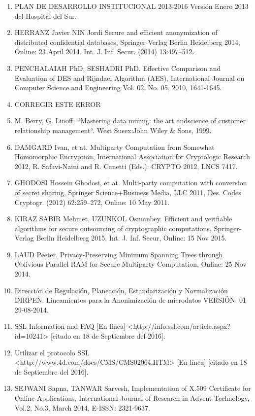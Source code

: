 \documentclass[a4paper,openright,12pt]{book}
\theoremstyle{definition}
\theoremstyle{remark}
\begin{document}
\begin{enumerate}
	\item PLAN DE DESARROLLO INSTITUCIONAL 2013-2016 Versión Enero 2013 del Hospital del Sur.
	\item HERRANZ Javier NIN Jordi Secure and efficient anonymization of distributed confidential databases, Springer-Verlag Berlin Heidelberg 2014, Online: 23 April 2014. Int. J. Inf. Secur. (2014) 13:497–512.
	\item PENCHALAIAH PhD, SESHADRI  PhD. Effective Comparison and Evaluation of DES and Rijndael Algorithm (AES), International Journal on Computer Science and Engineering Vol. 02, No. 05, 2010, 1641-1645.
    \item CORREGIR ESTE ERROR%
    \item M. Berry, G. Linoff, “Mastering data mining: the art andscience of customer relationship management“. West Susex:John Wiley \& Sons, 1999.
    \item DAMGARD Ivan, et at. Multiparty Computation from Somewhat Homomorphic Encryption, International Association for Cryptologic Research 2012, R. Safavi-Naini and R. Canetti (Eds.): CRYPTO 2012, LNCS 7417.
    \item GHODOSI Hossein Ghodosi, et at. Multi-party computation with conversion of secret sharing, Springer Science+Business Media, LLC 2011, Des. Codes Cryptogr. (2012) 62:259–272, Online: 10 May 2011.
    \item KIRAZ SABIR Mehmet, UZUNKOL Osmanbey. Efficient and verifiable algorithms for secure outsourcing of cryptographic computations, Springer-Verlag Berlin Heidelberg 2015, Int. J. Inf. Secur, Online: 15 Nov 2015.
    \item LAUD Peeter. Privacy-Preserving Minimum Spanning Trees through Oblivious Parallel RAM for Secure Multiparty Computation, Online: 25 Nov 2014.
    \item Dirección de Regulación, Planeación, Estandarización y Normalización DIRPEN. Lineamientos para la Anonimización de microdatos VERSIÓN: 01 29-08-2014.
    \item SSL Information and FAQ [En línea] <http://info.ssl.com/article.aspx?id=10241> [citado en 18 de Septiembre del 2016].
    \item Utilizar el protocolo SSL <http://www.4d.com/docs/CMS/CMS02064.HTM> [En línea] [citado en 18 de Septiembre del 2016].
    \item SEJWANI Sapna, TANWAR Sarvesh, Implementation of X.509 Certificate for Online Applications, International Journal of Research in Advent Technology, Vol.2, No.3, March 2014, E-ISSN: 2321-9637.

\end{enumerate}
\end{document}
